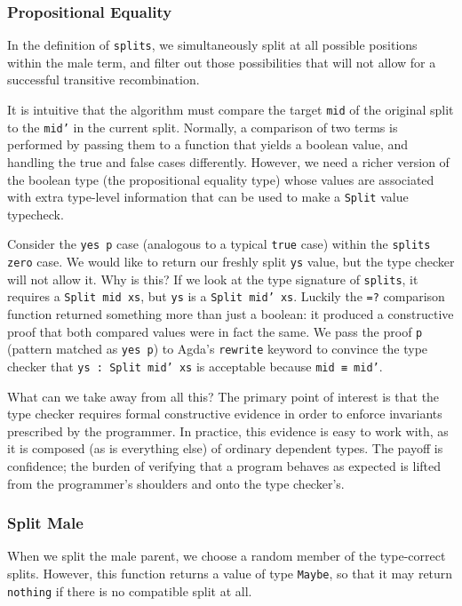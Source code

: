 \documentclass[runningheads,a4paper]{llncs}
\begin{document}
\subsubsection{Propositional Equality}

In the definition of \texttt{splits}, we simultaneously split at all
possible positions within the male term, and filter out those possibilities that
will not allow for a successful transitive recombination.

It is intuitive that the algorithm must compare the target \texttt{mid}
of the original split to the \texttt{mid'} in the current
split. Normally, a comparison of two terms is performed by passing them
to a function that yields a boolean value, and handling the true and false
cases differently. However, we need a richer version of the
boolean type (the propositional equality type) whose values are
associated with extra type-level information that can be used to make
a \texttt{Split} value typecheck.

Consider the \texttt{yes p} case (analogous to a typical \texttt{true}
case) within the \texttt{splits zero} case. We would like to return
our freshly split \texttt{ys} value, but the type checker will not allow
it. Why is this? If we look at the type signature of \texttt{splits}, it
requires a \texttt{Split mid xs}, but \texttt{ys} is a \texttt{Split mid'
  xs}. Luckily the \texttt{=?} comparison function returned something
more than just a boolean: it produced a constructive proof that both compared
values were in fact the same. We pass the proof \texttt{p} (pattern
matched as \texttt{yes p}) to Agda's \texttt{rewrite} keyword to
convince the type checker that \texttt{ys : Split mid' xs} is acceptable
because \texttt{mid ≡ mid'}.

What can we take away from all this? The primary point of interest is that
the type checker requires formal constructive evidence in order to enforce
invariants prescribed by the programmer. In practice, this evidence is easy to work
with, as it is composed (as is everything else) of ordinary dependent types.
The payoff is confidence; the burden of verifying that a program behaves as expected
is lifted from the programmer's shoulders and onto the type checker's.

\subsubsection{Split Male}

When we split the male parent, we choose a random member of the
type-correct splits. However, this function returns a value of type
\texttt{Maybe}, so that it may return \texttt{nothing} if there is no
compatible split at all.
\end{document}
